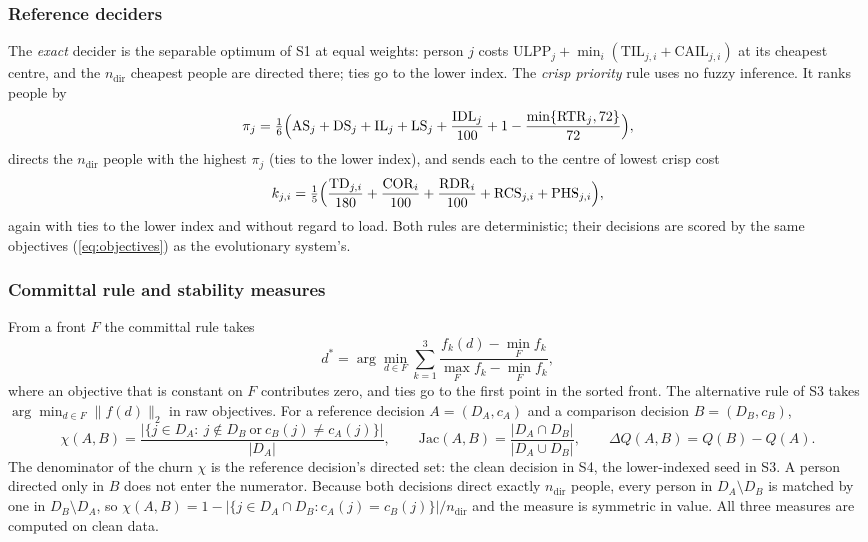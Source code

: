 \subsubsection{Reference deciders}
The \emph{exact} decider is the separable optimum of S1 at equal weights: person $j$ costs
$\mathrm{ULPP}_j+\min_i(\mathrm{TIL}_{j,i}+\mathrm{CAIL}_{j,i})$ at its cheapest centre, and the
$n_{\mathrm{dir}}$ cheapest people are directed there; ties go to the lower index. The
\emph{crisp priority} rule uses no fuzzy inference. It ranks people by
\begin{equation}\label{eq:crisp-priority}
\pi_j=\tfrac16\Bigl(\mathrm{AS}_j+\mathrm{DS}_j+\mathrm{IL}_j+\mathrm{LS}_j+\frac{\mathrm{IDL}_j}{100}
+1-\frac{\min\{\mathrm{RTR}_j,72\}}{72}\Bigr),
\end{equation}
directs the $n_{\mathrm{dir}}$ people with the highest $\pi_j$ (ties to the lower index), and
sends each to the centre of lowest crisp cost
\begin{equation}\label{eq:crisp-cost}
k_{j,i}=\tfrac15\Bigl(\frac{\mathrm{TD}_{j,i}}{180}+\frac{\mathrm{COR}_i}{100}+\frac{\mathrm{RDR}_i}{100}
+\mathrm{RCS}_{j,i}+\mathrm{PHS}_{j,i}\Bigr),
\end{equation}
again with ties to the lower index and without regard to load. Both rules are deterministic;
their decisions are scored by the same objectives (\ref{eq:objectives}) as the evolutionary
system's.

\subsubsection{Committal rule and stability measures}
From a front $F$ the committal rule takes
\begin{equation}\label{eq:committal}
d^\ast=\arg\min_{d\in F}\sum_{k=1}^{3}\frac{f_k(d)-\min_{F}f_k}{\max_{F}f_k-\min_{F}f_k},
\end{equation}
where an objective that is constant on $F$ contributes zero, and ties go to the first point
in the sorted front. The alternative rule of S3 takes $\arg\min_{d\in F}\lVert f(d)\rVert_2$
in raw objectives. For a reference decision $A=(D_A,c_A)$ and a comparison decision
$B=(D_B,c_B)$,
\begin{equation}\label{eq:churn}
\chi(A,B)=\frac{\bigl|\{j\in D_A:\ j\notin D_B\ \text{or}\ c_B(j)\neq c_A(j)\}\bigr|}{|D_A|},
\qquad
\mathrm{Jac}(A,B)=\frac{|D_A\cap D_B|}{|D_A\cup D_B|},
\qquad
\Delta Q(A,B)=Q(B)-Q(A).
\end{equation}
The denominator of the churn $\chi$ is the reference decision's directed set: the clean
decision in S4, the lower-indexed seed in S3. A person directed only in $B$ does not enter the
numerator. Because both decisions direct exactly $n_{\mathrm{dir}}$ people, every person in
$D_A\setminus D_B$ is matched by one in $D_B\setminus D_A$, so
$\chi(A,B)=1-|\{j\in D_A\cap D_B: c_A(j)=c_B(j)\}|/n_{\mathrm{dir}}$ and the measure is
symmetric in value. All three measures are computed on clean data.

